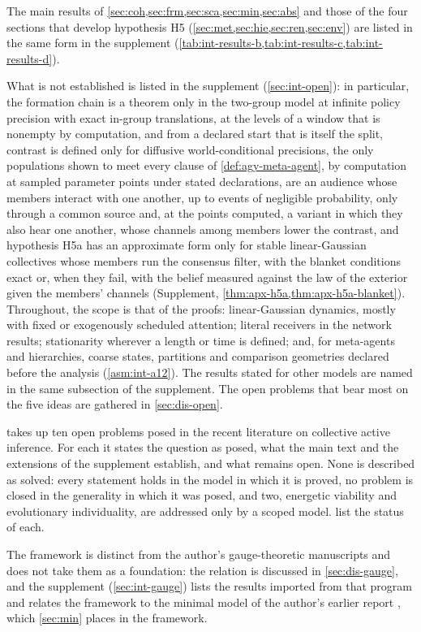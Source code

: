 The main results of \cref{sec:coh,sec:frm,sec:sca,sec:min,sec:abs} and those of the four sections that develop hypothesis H5 (\cref{sec:met,sec:hie,sec:ren,sec:env}) are listed in the same form in the supplement (\cref{tab:int-results-b,tab:int-results-c,tab:int-results-d}).

What is not established is listed in the supplement (\cref{sec:int-open}): in particular, the formation chain is a theorem only in the two-group model at infinite policy precision with exact in-group translations, at the levels of a window that is nonempty by computation, and from a declared start that is itself the split, contrast is defined only for diffusive world-conditional precisions, the only populations shown to meet every clause of \cref{def:agy-meta-agent}, by computation at sampled parameter points under stated declarations, are an audience whose members interact with one another, up to events of negligible probability, only through a common source and, at the points computed, a variant in which they also hear one another, whose channels among members lower the contrast, and hypothesis H5a has an approximate form only for stable linear-Gaussian collectives whose members run the consensus filter, with the blanket conditions exact or, when they fail, with the belief measured against the law of the exterior given the members' channels (Supplement, \cref{thm:apx-h5a,thm:apx-h5a-blanket}). Throughout, the scope is that of the proofs: linear-Gaussian dynamics, mostly with fixed or exogenously scheduled attention; literal receivers in the network results; stationarity wherever a length or time is defined; and, for meta-agents and hierarchies, coarse states, partitions and comparison geometries declared before the analysis (\cref{asm:int-a12}). The results stated for other models are named in the same subsection of the supplement. The open problems that bear most on the five ideas are gathered in \cref{sec:dis-open}.

 takes up ten open problems posed in the recent literature on collective active inference. For each it states the question as posed, what the main text and the extensions of the supplement establish, and what remains open. None is described as solved: every statement holds in the model in which it is proved, no problem is closed in the generality in which it was posed, and two, energetic viability and evolutionary individuality, are addressed only by a scoped model.  list the status of each.

The framework is distinct from the author's gauge-theoretic manuscripts \citep{dennis2026magent,dennis2026participatory} and does not take them as a foundation: the relation is discussed in \cref{sec:dis-gauge}, and the supplement (\cref{sec:int-gauge}) lists the results imported from that program and relates the framework to the minimal model of the author's earlier report \citep{dennis2026communicating}, which \cref{sec:min} places in the framework.

